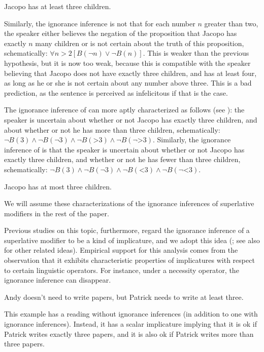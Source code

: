 \documentclass[output=paper]{langscibook}
\begin{document}
    \ea Jacopo has at least three children. \label{don-sud:children2}\z

\noindent Similarly, the ignorance inference is not that for each number $n$ greater than two, the speaker either believes the negation of the proposition that Jacopo has exactly $n$ many children or is not certain about the truth of this proposition, schematically: $\forall n> 2 [B(\neg n) \lor \neg B(n)]$. This is weaker than the previous hypothesis, but it is now too weak, because this is compatible with the speaker believing that Jacopo does not have exactly three children, and has at least four, as long as he or she is not certain about any number above three. This is a bad prediction, as the sentence is perceived as infelicitous if that is the case.

The ignorance inference of  can more aptly characterized as follows (see \citealt{buring, mayr, schwarz}): the speaker is uncertain about whether or not Jacopo has exactly three children, and about whether or not he has more than three children, schematically: $\neg B(3) \land \neg B(\neg 3) \land \neg B(\mathord{>}3) \land \neg B(\neg \mathord{>}3)$. Similarly, the ignorance inference of  is that the speaker is uncertain about whether or not Jacopo has exactly three children, and whether or not he has fewer than three children, schematically: $\neg B(3) \land \neg B(\neg 3) \land \neg B(\mathord{<}3) \land \neg B(\neg \mathord{<}3)$.

    \ea Jacopo has at most three children. \label{don-sud:children3}
    \z
    
\noindent We will assume these characterizations of the ignorance inferences of superlative modifiers in the rest of the paper.

Previous studies on this topic, furthermore, regard the ignorance inference of a superlative modifier to be a kind of implicature, and we adopt this idea (\citealt{buring, mayr, schwarz, buccolahaida:18, mendia}; see also \citealt{geurts-nouwen, coppock-brochhagen, cohen-krifka} for other related ideas). Empirical support for this analysis comes from the observation that it exhibits characteristic properties of implicatures with respect to certain linguistic operators. For instance, under a necessity operator, the ignorance inference can disappear.

    \ea Andy doesn't need to write papers, but Patrick needs to write at least three.\label{don-sud:need}\z

\noindent This example has a reading without ignorance inferences (in addition to one with ignorance inferences). Instead, it has a scalar implicature implying that it is ok if Patrick writes exactly three papers, and it is also ok if Patrick writes more than three papers.
\end{document}
